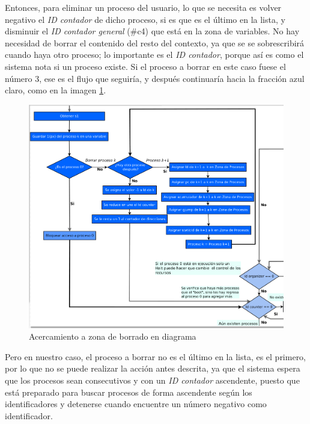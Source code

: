 \documentclass[letterpaper,12pt,oneside]{book}
\begin{document}
		Entonces, para eliminar un proceso del usuario, lo que se necesita es volver negativo el \textit{ID contador} de dicho proceso,
		si es que es el último en la lista, y disminuir el  \textit{ID contador general} (\#c4) que está en la zona de variables. 
		No hay necesidad 
		de borrar el contenido del resto
		del contexto, ya que se se sobrescribirá cuando haya otro proceso; lo importante es el \textit{ID contador}, porque así es como el sistema nota
		si un proceso existe. Si el proceso a borrar en este caso fuese el número 3, ese es el flujo que seguiría, y después continuaría hacia la 
		fracción azul claro, como en la imagen 
		\ref{fig:diagZonaBorrado}.
		
		
		\begin{figure}[h]		
			\centering
			\includegraphics[scale=0.45]{media/CARDIACC/diagZOnaBorrado.png}
			\caption{ Acercamiento a zona de borrado en diagrama}
			\label{fig:diagZonaBorrado}
		\end{figure}
		
		Pero en nuestro caso, el proceso a borrar no es el último en la lista, es el primero, por lo que no se puede realizar la acción antes
		descrita, ya que el sistema espera que los procesos sean consecutivos y con un \textit{ID contador} ascendente, 
		puesto que está preparado para buscar procesos de forma ascendente según los identificadores
		y detenerse cuando encuentre un número negativo como identificador. 
		
\end{document}
